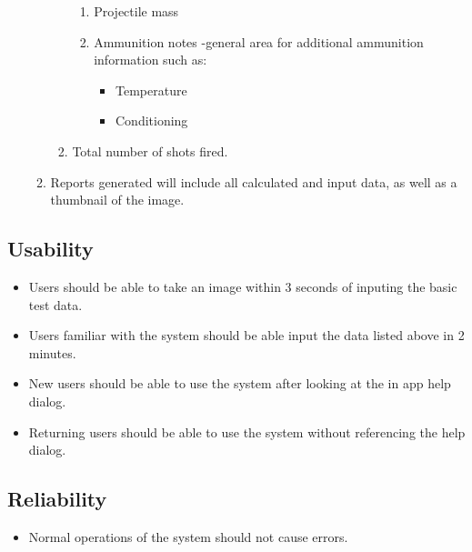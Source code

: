 \begin{enumerate}
\begin{enumerate}
\begin{enumerate}
\begin{enumerate}
				\item Projectile mass
				\item Ammunition notes -general area for additional ammunition information such as:
				\begin{itemize}
					\item Temperature
					\item Conditioning
				\end{itemize}
			\end{enumerate}
			\item Total number of shots fired.
		\end{enumerate}
		\item Reports generated will include all calculated and input data, as well as a thumbnail of the 				image.
	\end{enumerate}
\end{enumerate}
\subsection{Usability}
\begin{itemize}
\item Users should be able to take an image within 3 seconds of inputing the basic test data.
\item Users familiar with the system should be able input the data listed above in 2 minutes.
\item New users should be able to use the system after looking at the in app help dialog.
\item Returning users should be able to use the system without referencing the help dialog.
\end{itemize}
\subsection{Reliability}
\begin{itemize}
\item Normal operations of the system should not cause errors.
\end{itemize}
